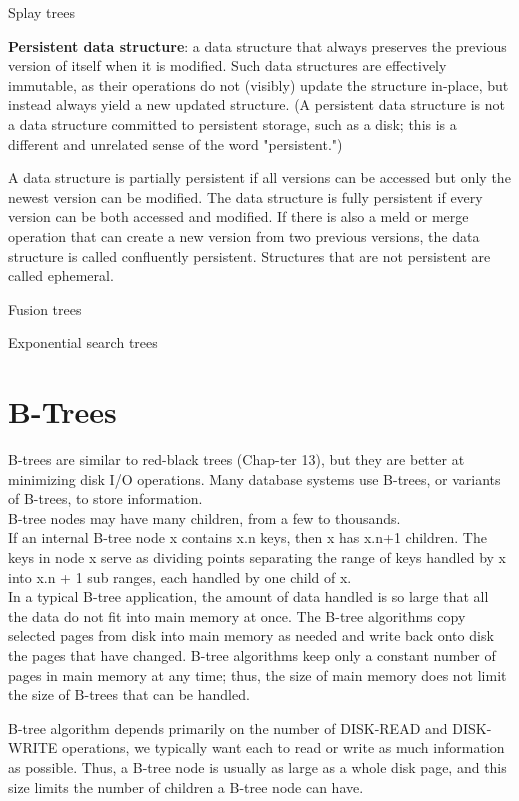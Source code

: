 \documentclass{article}
\begin{document}
Splay trees

\textbf{Persistent data structure}: a data structure that always preserves the previous version of itself when it is modified. Such data structures are effectively immutable, as their operations do not (visibly) update the structure in-place, but instead always yield a new updated structure. (A persistent data structure is not a data structure committed to persistent storage, such as a disk; this is a different and unrelated sense of the word "persistent.")\par
A data structure is partially persistent if all versions can be accessed but only the newest version can be modified. The data structure is fully persistent if every version can be both accessed and modified. If there is also a meld or merge operation that can create a new version from two previous versions, the data structure is called confluently persistent. Structures that are not persistent are called ephemeral.

Fusion trees

Exponential search trees

\section{B-Trees}
B-trees are similar to red-black trees (Chap-ter 13), but they are better at minimizing disk I/O operations. Many database systems use B-trees, or variants of B-trees, to store information.\\
B-tree nodes may have many children, from a few to thousands.\\
If an internal B-tree node x contains x.n keys, then x has x.n+1 children. The keys in node x serve as dividing points separating the range of keys handled by x into x.n + 1 sub ranges, each handled by one child of x.\\
In a typical B-tree application, the amount of data handled is so large that all the data do not fit into main memory at once. The B-tree algorithms copy selected pages from disk into main memory as needed and write back onto disk the pages that have changed. B-tree algorithms keep only a constant number of pages in main memory at any time; thus, the size of main memory does not limit the size of B-trees that can be handled.

B-tree algorithm depends primarily on the number of DISK-READ and DISK-WRITE operations, we typically want each to read or write as much information as possible. Thus, a B-tree node is usually as large as a whole disk page, and this size limits the number of children a B-tree node can have.
\end{document}

